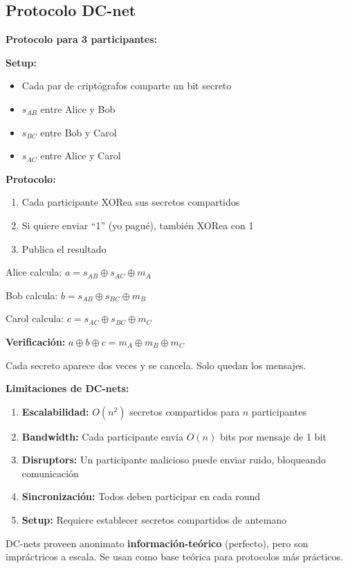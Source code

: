 \documentclass[11pt,a4paper,twoside]{book}
\begin{document}
\subsection{Protocolo DC-net}

\begin{mathnote}
\textbf{Protocolo para 3 participantes:}

\textbf{Setup:}
\begin{itemize}
    \item Cada par de cript\'ografos comparte un bit secreto
    \item $s_{AB}$ entre Alice y Bob
    \item $s_{BC}$ entre Bob y Carol
    \item $s_{AC}$ entre Alice y Carol
\end{itemize}

\textbf{Protocolo:}
\begin{enumerate}
    \item Cada participante XORea sus secretos compartidos
    \item Si quiere enviar ``1'' (yo pagu\'e), tambi\'en XORea con 1
    \item Publica el resultado
\end{enumerate}

Alice calcula: $a = s_{AB} \oplus s_{AC} \oplus m_A$

Bob calcula: $b = s_{AB} \oplus s_{BC} \oplus m_B$

Carol calcula: $c = s_{AC} \oplus s_{BC} \oplus m_C$

\textbf{Verificaci\'on:}
$a \oplus b \oplus c = m_A \oplus m_B \oplus m_C$

Cada secreto aparece dos veces y se cancela. Solo quedan los mensajes.
\end{mathnote}

\begin{remark}
\textbf{Limitaciones de DC-nets:}

\begin{enumerate}
    \item \textbf{Escalabilidad:} $O(n^2)$ secretos compartidos para $n$ participantes
    \item \textbf{Bandwidth:} Cada participante env\'ia $O(n)$ bits por mensaje de 1 bit
    \item \textbf{Disruptors:} Un participante malicioso puede enviar ruido, bloqueando comunicaci\'on
    \item \textbf{Sincronizaci\'on:} Todos deben participar en cada round
    \item \textbf{Setup:} Requiere establecer secretos compartidos de antemano
\end{enumerate}

DC-nets proveen anonimato \textbf{informaci\'on-te\'orico} (perfecto), pero son impr\'actricos a escala. Se usan como base te\'orica para protocolos m\'as pr\'acticos.
\end{remark}
\end{document}
